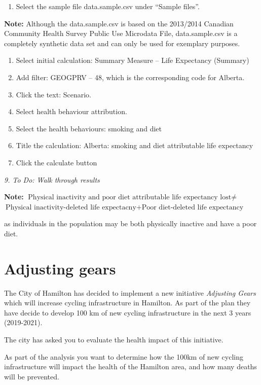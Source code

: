 \documentclass[]{book}
\providecommand{\tightlist}{%
  \setlength{\itemsep}{0pt}\setlength{\parskip}{0pt}}
\begin{document}
\begin{enumerate}
\def\labelenumi{\arabic{enumi}.}
\tightlist
\item
  Select the sample file data.sample.csv under ``Sample files''.
\end{enumerate}

\textbf{Note:} Although the data.sample.csv is based on the 2013/2014
Canadian Community Health Survey Public Use Microdata File,
data.sample.csv is a completely synthetic data set and can only be used
for exemplary purposes.

\begin{enumerate}
\def\labelenumi{\arabic{enumi}.}
\setcounter{enumi}{1}
\item
  Select initial calculation: Summary Measure -- Life Expectancy
  (Summary)
\item
  Add filter: GEOGPRV -- 48, which is the corresponding code for
  Alberta.
\item
  Click the text: Scenario.
\item
  Select health behaviour attribution.
\item
  Select the health behaviours: smoking and diet
\item
  Title the calculation: Alberta: smoking and diet attributable life
  expectancy
\item
  Click the calculate button
\end{enumerate}

\emph{9. To Do: Walk through results}

\textbf{Note:}
\(\text{Physical inactivity and poor diet attributable life expectancy lost} \neq\)
\(\text{Physical inactivity-deleted life expectacny} + \text{Poor diet-deleted life expectancy}\)

as individuals in the population may be both physically inactive and
have a poor diet.

\section{Adjusting gears}\label{adjusting-gears}

The City of Hamilton has decided to implement a new initiative
\emph{Adjusting Gears} which will increase cycling infrastructure in
Hamilton. As part of the plan they have decide to develop 100 km of new
cycling infrastructure in the next 3 years (2019-2021).

The city has asked you to evaluate the health impact of this initiative.

As part of the analysis you want to determine how the 100km of new
cycling infrastructure will impact the health of the Hamilton area, and
how many deaths will be prevented.
\end{document}
